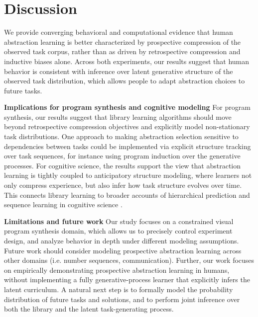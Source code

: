 \documentclass{article}
\begin{document}

\section{Discussion}

We provide converging behavioral and computational evidence that human abstraction learning is better characterized by prospective compression of the observed task corpus, rather than as driven by retrospective compression and inductive biases alone. Across both experiments, our results suggest that human behavior is consistent with inference over latent generative structure of the observed task distribution, which allows people to adapt abstraction choices to future tasks. 
 
\textbf{Implications for program synthesis and cognitive modeling}
For program synthesis, our results suggest that library learning algorithms should move beyond retrospective compression objectives and explicitly model non-stationary task distributions. 
One approach to making abstraction selection sensitive to dependencies between tasks could be implemented via explicit structure tracking over task sequences, for instance using program induction over the generative processes. 
For cognitive science, the results support the view that abstraction learning is tightly coupled to anticipatory structure modeling, where learners not only compress experience, but also infer how task structure evolves over time. This connects library learning to broader accounts of hierarchical prediction and sequence learning in cognitive science \citep{correa2025exploring,kryven2025cognitive, qin2025planning,sharma2022mapi,rule2024symbolic}.


\textbf{Limitations and future work}
Our study focuses on a constrained visual program synthesis domain, which allows us to precisely control experiment design, and analyze behavior in depth under different modeling assumptions. Future work should consider modeling prospective abstraction learning across other domains (i.e. number sequences, communication).
Further, our work focuses on empirically demonstrating  prospective abstraction learning in humans, without implementing a fully generative-process learner that explicitly infers the latent curriculum. A natural next step is to formally model the probability distribution of future tasks and solutions, and to perform joint inference over both the library and the latent task-generating process. 
\end{document}
